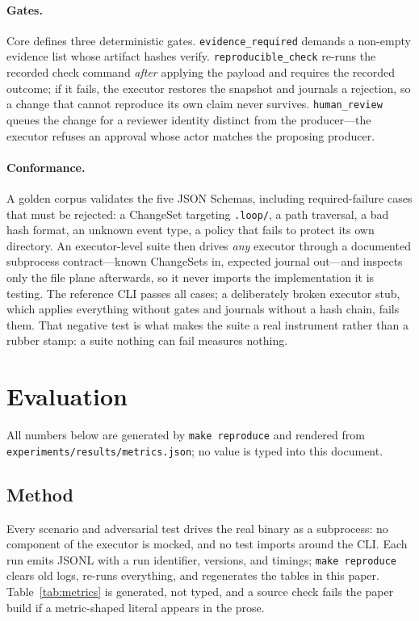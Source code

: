 \documentclass[10pt,twocolumn]{article}
\begin{document}
\paragraph{Gates.} Core defines three deterministic gates.
\texttt{evidence\_required} demands a non-empty evidence list whose
artifact hashes verify. \texttt{reproducible\_check} re-runs the recorded
check command \emph{after} applying the payload and requires the recorded
outcome; if it fails, the executor restores the snapshot and journals a
rejection, so a change that cannot reproduce its own claim never survives.
\texttt{human\_review} queues the change for a reviewer identity distinct
from the producer---the executor refuses an approval whose actor matches
the proposing producer.

\paragraph{Conformance.} A golden corpus validates the five JSON Schemas,
including required-failure cases that must be rejected: a ChangeSet
targeting \texttt{.loop/}, a path traversal, a bad hash format, an unknown
event type, a policy that fails to protect its own directory. An
executor-level suite then drives \emph{any} executor through a documented
subprocess contract---known ChangeSets in, expected journal out---and
inspects only the file plane afterwards, so it never imports the
implementation it is testing. The reference CLI passes all cases; a
deliberately broken executor stub, which applies everything without gates
and journals without a hash chain, fails them. That negative test is what
makes the suite a real instrument rather than a rubber stamp: a suite
nothing can fail measures nothing.

\section{Evaluation}
\label{sec:eval}
All numbers below are generated by \texttt{make reproduce} and rendered
from \texttt{experiments/results/metrics.json}; no value is typed into this
document.

\begin{table}[t]
\centering
\small

\caption{Headline metrics. Every value is regenerated from run logs; the
source run identifies the log under \texttt{experiments/*/logs/}.}
\label{tab:metrics}
\end{table}

\subsection{Method}
Every scenario and adversarial test drives the real binary as a
subprocess: no component of the executor is mocked, and no test imports
around the CLI. Each run emits JSONL with a run identifier, versions, and
timings; \texttt{make reproduce} clears old logs, re-runs everything, and
regenerates the tables in this paper. Table~\ref{tab:metrics} is generated,
not typed, and a source check fails the paper build if a metric-shaped
literal appears in the prose.
\end{document}
